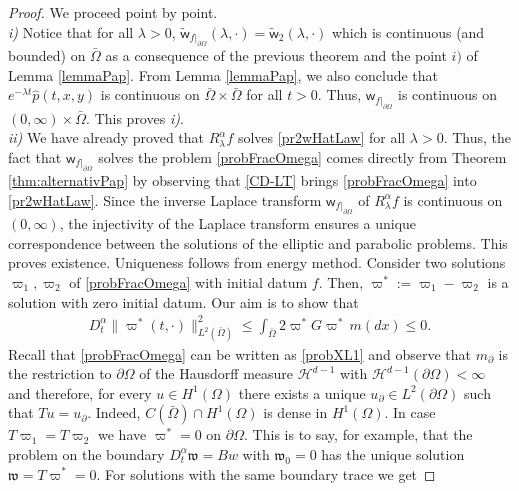 \documentclass[11pt,a4paper]{article}
\begin{document}
\begin{proof}
We proceed point by point. \\

\textit{i)} Notice that for all $\lambda > 0$, $\tilde{\mathsf{w}}_{f|_{\partial \Omega}}(\lambda, \cdot) = \tilde{\mathsf{w}}_2(\lambda, \cdot)$ which is continuous (and bounded) on $\bar{\Omega}$ as a consequence of the previous theorem and the point $i)$ of Lemma \ref{lemmaPap}. From Lemma \ref{lemmaPap}, we also conclude that $e^{-\lambda t} \hat{p}(t,x,y)$ is continuous on $\bar{\Omega} \times \bar{\Omega}$ for all $t> 0$. Thus, $\mathsf{w}_{f|_{\partial \Omega}}$ is continuous on $(0, \infty)\times \bar{\Omega}$. This proves \textit{i)}. \\

\textit{ii)} 
We have already proved that $R^\alpha_\lambda f$ solves \eqref{pr2wHatLaw} for all $\lambda>0$. Thus, the fact that $\mathsf{w}_{f|_{\partial \Omega}}$ solves the problem \eqref{probFracOmega} comes directly from Theorem \ref{thm:alternativPap} by observing that \eqref{CD-LT} brings \eqref{probFracOmega} into \eqref{pr2wHatLaw}. Since the inverse Laplace transform $\mathsf{w}_{f|_{\partial \Omega}}$ of $R^\alpha_\lambda f$ is continuous on $(0,\infty)$, the injectivity of the Laplace transform ensures a unique correspondence between the solutions of the elliptic and parabolic problems. This proves existence. Uniqueness follows from energy method. Consider two solutions $\varpi_1, \varpi_2$ of \eqref{probFracOmega} with initial datum $f$. Then, $\varpi^* := \varpi_1 - \varpi_2$ is a solution with zero initial datum. Our aim is to show that
\begin{align*}
D^\alpha_t \| \varpi^*(t, \cdot) \|^2_{L^2(\bar{\Omega})} \leq  \int_{\bar{\Omega}} 2 \varpi^* G \varpi^*\, m(dx) \leq 0.
\end{align*} 
Recall that \eqref{probFracOmega} can be written as \eqref{probXL1} and observe that $m_\partial$ is the restriction to $\partial \Omega$ of the Hausdorff measure $\mathcal{H}^{d-1}$  with $\mathcal{H}^{d-1}(\partial\Omega)< \infty$ and therefore, for every $u \in H^1(\Omega)$ there exists a unique $u_\partial \in L^2(\partial \Omega)$ such that $Tu = u_\partial$. Indeed, $C(\bar{\Omega}) \cap H^1(\Omega)$ is dense in $H^1(\Omega)$. In case $T\varpi_1 = T\varpi_2$ we have $\varpi^* =0$ on $\partial \Omega$. This is to say, for example, that the problem on the boundary $D^\alpha_t \mathfrak{w} = B w$ with $\mathfrak{w}_0=0$ has the unique solution $\mathfrak{w}=T \varpi^* =0$. For solutions with the same boundary trace we get

\end{proof}
\end{document}
